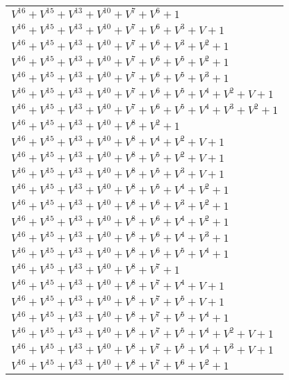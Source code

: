 \documentclass[12pt]{article}
\begin{document}
\begin{adjustwidth}{-4cm}{}
\begin{center}
\begin{longtable}{|l|}
$V^{16}  +V^{15}  +V^{13}  +V^{10}  +V^{7}  +V^{6}  + 1$ \\
$V^{16}  +V^{15}  +V^{13}  +V^{10}  +V^{7}  +V^{6}  +V^{3}  + V + 1$ \\
$V^{16}  +V^{15}  +V^{13}  +V^{10}  +V^{7}  +V^{6}  +V^{3}  +V^{2}  + 1$ \\
$V^{16}  +V^{15}  +V^{13}  +V^{10}  +V^{7}  +V^{6}  +V^{5}  +V^{2}  + 1$ \\
$V^{16}  +V^{15}  +V^{13}  +V^{10}  +V^{7}  +V^{6}  +V^{5}  +V^{3}  + 1$ \\
$V^{16}  +V^{15}  +V^{13}  +V^{10}  +V^{7}  +V^{6}  +V^{5}  +V^{4}  +V^{2}  + V + 1$ \\
$V^{16}  +V^{15}  +V^{13}  +V^{10}  +V^{7}  +V^{6}  +V^{5}  +V^{4}  +V^{3}  +V^{2}  + 1$ \\
$V^{16}  +V^{15}  +V^{13}  +V^{10}  +V^{8}  +V^{2}  + 1$ \\
$V^{16}  +V^{15}  +V^{13}  +V^{10}  +V^{8}  +V^{4}  +V^{2}  + V + 1$ \\
$V^{16}  +V^{15}  +V^{13}  +V^{10}  +V^{8}  +V^{5}  +V^{2}  + V + 1$ \\
$V^{16}  +V^{15}  +V^{13}  +V^{10}  +V^{8}  +V^{5}  +V^{3}  + V + 1$ \\
$V^{16}  +V^{15}  +V^{13}  +V^{10}  +V^{8}  +V^{5}  +V^{4}  +V^{2}  + 1$ \\
$V^{16}  +V^{15}  +V^{13}  +V^{10}  +V^{8}  +V^{6}  +V^{3}  +V^{2}  + 1$ \\
$V^{16}  +V^{15}  +V^{13}  +V^{10}  +V^{8}  +V^{6}  +V^{4}  +V^{2}  + 1$ \\
$V^{16}  +V^{15}  +V^{13}  +V^{10}  +V^{8}  +V^{6}  +V^{4}  +V^{3}  + 1$ \\
$V^{16}  +V^{15}  +V^{13}  +V^{10}  +V^{8}  +V^{6}  +V^{5}  +V^{4}  + 1$ \\
$V^{16}  +V^{15}  +V^{13}  +V^{10}  +V^{8}  +V^{7}  + 1$ \\
$V^{16}  +V^{15}  +V^{13}  +V^{10}  +V^{8}  +V^{7}  +V^{4}  + V + 1$ \\
$V^{16}  +V^{15}  +V^{13}  +V^{10}  +V^{8}  +V^{7}  +V^{5}  + V + 1$ \\
$V^{16}  +V^{15}  +V^{13}  +V^{10}  +V^{8}  +V^{7}  +V^{5}  +V^{4}  + 1$ \\
$V^{16}  +V^{15}  +V^{13}  +V^{10}  +V^{8}  +V^{7}  +V^{5}  +V^{4}  +V^{2}  + V + 1$ \\
$V^{16}  +V^{15}  +V^{13}  +V^{10}  +V^{8}  +V^{7}  +V^{5}  +V^{4}  +V^{3}  + V + 1$ \\
$V^{16}  +V^{15}  +V^{13}  +V^{10}  +V^{8}  +V^{7}  +V^{6}  +V^{2}  + 1$ \\

\end{longtable}
\end{center}
\end{adjustwidth}
\end{document}
